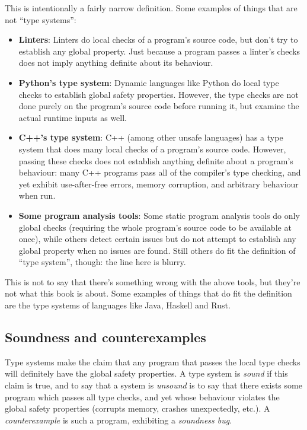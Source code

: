 \documentclass[11pt,oneside]{article}
\newenvironment{ceitemize}{\begin{itemize}}{\end{itemize}}
\begin{document}
This is intentionally a fairly narrow definition. Some examples of things that are not ``type systems'':

\begin{ceitemize}
\item \textbf{Linters}: Linters do local checks of a program's source code, but don't try to establish any global property. Just because a program passes a linter's checks does not imply anything definite about its behaviour.
\item \textbf{Python's type system}: Dynamic languages like Python do local type checks to establish global safety properties. However, the type checks are not done purely on the program's source code before running it, but examine the actual runtime inputs as well.
\item \textbf{C++'s type system}: C++ (among other unsafe languages) has a type system that does many local checks of a program's source code. However, passing these checks does not establish anything definite about a program's behaviour: many C++ programs pass all of the compiler's type checking, and yet exhibit use-after-free errors, memory corruption, and arbitrary behaviour when run.
\item \textbf{Some program analysis tools}: Some static program analysis tools do only global checks (requiring the whole program's source code to be available at once), while others detect certain issues but do not attempt to establish any global property when no issues are found. Still others do fit the definition of ``type system'', though: the line here is blurry.
\end{ceitemize}

This is not to say that there's something wrong with the above tools, but they're not what this book is about. Some examples of things that do fit the definition are the type systems of languages like Java, Haskell and Rust.

\subsection*{Soundness and counterexamples}
Type systems make the claim that any program that passes the local type checks will definitely have the global safety properties. A type system is \emph{sound} if this claim is true, and to say that a system is \emph{unsound} is to say that there exists some program which passes all type checks, and yet whose behaviour violates the global safety properties (corrupts memory, crashes unexpectedly, etc.). A \emph{counterexample} is such a program, exhibiting a \emph{soundness bug}.
\end{document}
